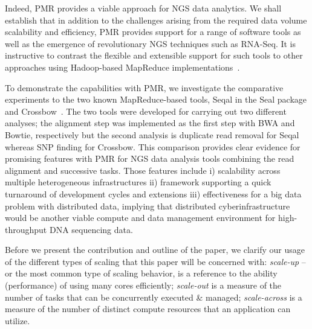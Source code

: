 \documentclass{acm_proc_article-sp}
\begin{document}
Indeed, PMR provides a viable approach for NGS data analytics.  We
shall establish that in addition to the challenges arising from the
required data volume scalability and efficiency, PMR provides support
for a range of software tools as well as the emergence of
revolutionary NGS techniques such as RNA-Seq.  It is instructive to
contrast the flexible and extensible support for such tools to other
approaches using Hadoop-based MapReduce
implementations~\cite{cloudburst,langmead2009,seal2011,langmead2010}.

To demonstrate the capabilities with PMR, we investigate the
comparative experiments to the two known MapReduce-based tools, Seqal
in the Seal package and Crossbow~\cite{seal2011,langmead2010}.  The
two tools were developed for carrying out two different analyses; the
alignment step was implemented as the first step with BWA and Bowtie,
respectively but the second analysis is duplicate read removal for
Seqal whereas SNP finding for Crossbow.  This comparison provides
clear evidence for promising features with PMR for NGS data analysis
tools combining the read alignment and successive tasks.  Those
features include i) scalability across multiple heterogeneous
infrastructures ii) framework supporting a quick turnaround of
development cycles and extensions iii) effectiveness for a big data
problem with distributed data, implying that distributed
cyberinfrastructure would be another viable compute and data
management environment for high-throughput DNA sequencing data.

Before we present the contribution and outline of the paper, we
clarify our usage of the different types of scaling that this paper
will be concerned with: {\it scale-up} -- or the most common type of
scaling behavior, is a reference to the ability (performance) of using
many cores efficiently; {\it scale-out} is a measure of the number of
tasks that can be concurrently executed \& managed; {\it scale-across}
is a measure of the number of distinct compute resources that an
application can utilize.

\end{document}
